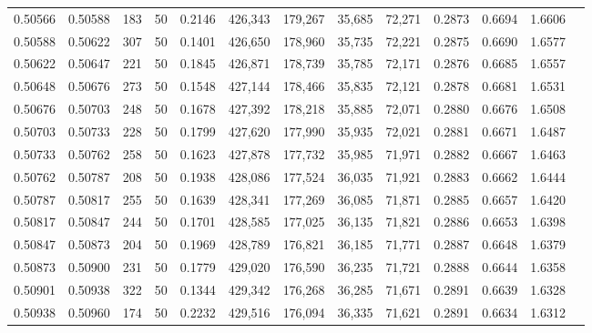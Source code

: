 \begin{tabular}{rrrrrrrrrrrrr}
0.50566 & 0.50588 &   183 &  50 &                                     0.2146 & 426,343 & 179,267 &  35,685 &  72,271 & 0.2873 & 0.6694 & 1.6606 \\
0.50588 & 0.50622 &   307 &  50 &                                     0.1401 & 426,650 & 178,960 &  35,735 &  72,221 & 0.2875 & 0.6690 & 1.6577 \\
0.50622 & 0.50647 &   221 &  50 &                                     0.1845 & 426,871 & 178,739 &  35,785 &  72,171 & 0.2876 & 0.6685 & 1.6557 \\
0.50648 & 0.50676 &   273 &  50 &                                     0.1548 & 427,144 & 178,466 &  35,835 &  72,121 & 0.2878 & 0.6681 & 1.6531 \\
0.50676 & 0.50703 &   248 &  50 &                                     0.1678 & 427,392 & 178,218 &  35,885 &  72,071 & 0.2880 & 0.6676 & 1.6508 \\
0.50703 & 0.50733 &   228 &  50 &                                     0.1799 & 427,620 & 177,990 &  35,935 &  72,021 & 0.2881 & 0.6671 & 1.6487 \\
0.50733 & 0.50762 &   258 &  50 &                                     0.1623 & 427,878 & 177,732 &  35,985 &  71,971 & 0.2882 & 0.6667 & 1.6463 \\
0.50762 & 0.50787 &   208 &  50 &                                     0.1938 & 428,086 & 177,524 &  36,035 &  71,921 & 0.2883 & 0.6662 & 1.6444 \\
0.50787 & 0.50817 &   255 &  50 &                                     0.1639 & 428,341 & 177,269 &  36,085 &  71,871 & 0.2885 & 0.6657 & 1.6420 \\
0.50817 & 0.50847 &   244 &  50 &                                     0.1701 & 428,585 & 177,025 &  36,135 &  71,821 & 0.2886 & 0.6653 & 1.6398 \\
0.50847 & 0.50873 &   204 &  50 &                                     0.1969 & 428,789 & 176,821 &  36,185 &  71,771 & 0.2887 & 0.6648 & 1.6379 \\
0.50873 & 0.50900 &   231 &  50 &                                     0.1779 & 429,020 & 176,590 &  36,235 &  71,721 & 0.2888 & 0.6644 & 1.6358 \\
0.50901 & 0.50938 &   322 &  50 &                                     0.1344 & 429,342 & 176,268 &  36,285 &  71,671 & 0.2891 & 0.6639 & 1.6328 \\
0.50938 & 0.50960 &   174 &  50 &                                     0.2232 & 429,516 & 176,094 &  36,335 &  71,621 & 0.2891 & 0.6634 & 1.6312 \\

\end{tabular}
